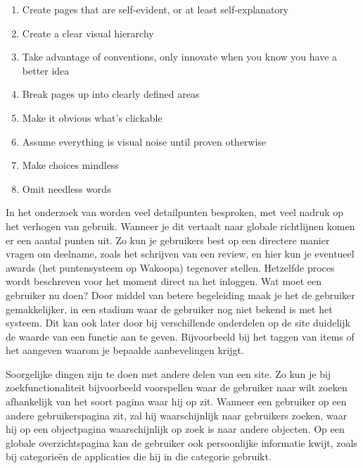 \documentclass[a4paper, 10pt, pdftex]{report}
\begin{document}
      \begin{enumerate}
        \item Create pages that are self-evident, or at least self-explanatory
        \item Create a clear visual hierarchy
        \item Take advantage of conventions, only innovate when you know you have a better idea
        \item Break pages up into clearly defined areas
        \item Make it obvious what's clickable
        \item Assume everything is visual noise until proven otherwise
        \item Make choices mindless
        \item Omit needless words
      \end{enumerate}

    In het onderzoek van \citeauthor{Alfrink2008} worden veel detailpunten besproken, met veel nadruk op het verhogen van gebruik. Wanneer je dit vertaalt naar globale richtlijnen komen er een aantal punten uit. Zo kun je gebruikers best op een directere manier vragen om deelname, zoals het schrijven van een review, en hier kun je eventueel awards (het puntensysteem op Wakoopa) tegenover stellen. Hetzelfde proces wordt beschreven voor het moment direct na het inloggen. Wat moet een gebruiker nu doen? Door middel van betere begeleiding maak je het de gebruiker gemakkelijker, in een stadium waar de gebruiker nog niet bekend is met het systeem. Dit kan ook later door bij verschillende onderdelen op de site duidelijk de waarde van een functie aan te geven. Bijvoorbeeld bij het taggen van items of het aangeven waarom je bepaalde aanbevelingen krijgt.

    Soorgelijke dingen zijn te doen met andere delen van een site. Zo kun je bij zoekfunctionaliteit bijvoorbeeld voorspellen waar de gebruiker naar wilt zoeken afhankelijk van het soort pagina waar hij op zit. Wanneer een gebruiker op een andere gebruikerspagina zit, zal hij waarschijnlijk naar gebruikers zoeken, waar hij op een objectpagina waarschijnlijk op zoek is naar andere objecten. Op een globale overzichtspagina kan de gebruiker ook persoonlijke informatie kwijt, zoals bij categorie\"en de applicaties die hij in die categorie gebruikt.
\end{document}
